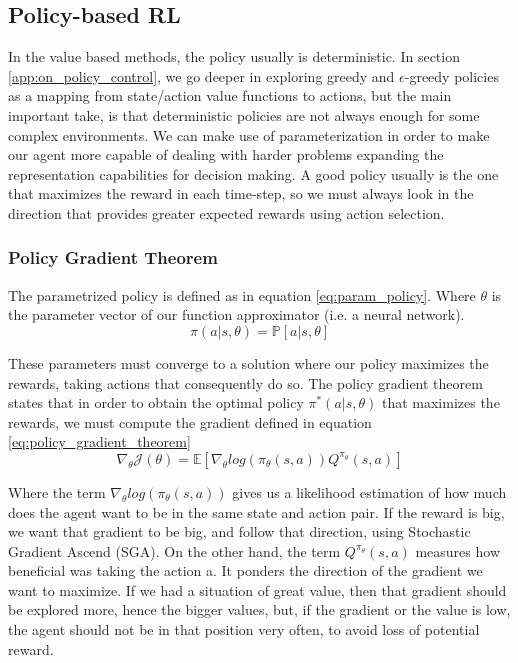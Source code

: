 \subsection{Policy-based RL}
\label{sec:pol-grad-ac}
In the value based methods, the policy usually is deterministic. In section \ref{app:on_policy_control}, we go deeper in exploring greedy and $\epsilon$-greedy policies as a mapping from state/action value functions to actions, but the main important take, is that deterministic policies are not always enough for some complex environments. We can make use of parameterization in order to make our agent more capable of dealing with harder problems expanding the representation capabilities for decision making. A good policy usually is the one that maximizes the reward in each time-step, so we must always look in the direction that provides greater expected rewards using action selection. 

\subsubsection{Policy Gradient Theorem}
\label{sec:pol-grad-theorem}
The parametrized policy is defined as in equation \ref{eq:param_policy}. Where $\theta$ is the parameter vector of our function approximator (i.e. a neural network).
\begin{equation} \label{eq:param_policy}
	\pi(a|s, \theta) = \mathbb{P}[a|s, \theta]
\end{equation}

These parameters must converge to a solution where our policy maximizes the rewards, taking actions that consequently do so. The policy gradient theorem states that in order to obtain the optimal policy $\pi^*(a|s, \theta)$ that maximizes the rewards, we must compute the gradient defined in equation \ref{eq:policy_gradient_theorem}
\begin{equation} \label{eq:policy_gradient_theorem}
	\nabla_{\theta}\mathcal{J}(\theta) = \mathbb{E}[\nabla_{\theta} log (\pi_{\theta}(s,a)) {Q}^{\pi_{\theta}}(s,a)]
\end{equation}

Where the term $\nabla_{\theta} log (\pi_{\theta}(s,a))$ gives us a likelihood estimation of how much does the agent want to be in the same state and action pair. If the reward is big, we want that gradient to be big, and follow that direction, using Stochastic Gradient Ascend (SGA). On the other hand, the term ${Q}^{\pi_{\theta}}(s,a)$ measures how beneficial was taking the action a. It ponders the direction of the gradient we want to maximize. If we had a situation of great value, then that gradient should be explored more, hence the bigger values, but, if the gradient or the value is low, the agent should not be in that position very often, to avoid loss of potential reward.

